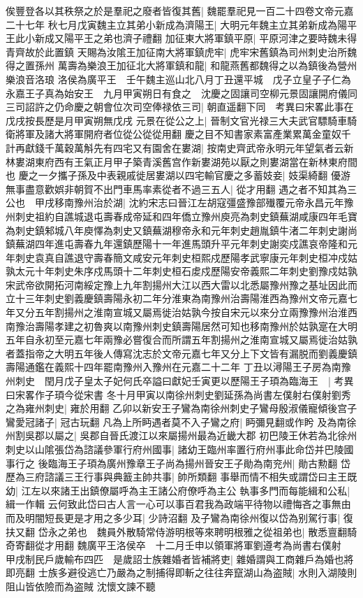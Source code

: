 俟豐登各以其秩祭之於是羣祀之廢者皆復其舊|{
	魏罷羣祀見一百二十四卷文帝元嘉二十七年}
秋七月戊寅魏主立其弟小新成為濟陽王|{
	大明元年魏主立其弟新成為陽平王此小新成又陽平王之弟也濟子禮翻}
加征東大將軍鎮平原|{
	平原河津之要時魏未得青齊故於此置鎮}
天賜為汝隂王加征南大將軍鎮虎牢|{
	虎牢宋舊鎮為司州刺史治所魏得之置孫州}
萬壽為樂浪王加征北大將軍鎮和龍|{
	和龍燕舊都魏得之以為鎮後為營州樂浪音洛琅}
洛侯為廣平王　壬午魏主巡山北八月丁丑還平城　戊子立皇子子仁為永嘉王子真為始安王　九月甲寅朔日有食之　沈慶之固讓司空柳元景固讓開府儀同三司詔許之仍命慶之朝會位次司空俸禄依三司|{
	朝直遥翻下同　考異曰宋畧此事在戊戌按長歷是月甲寅朔無戊戌}
元景在從公之上|{
	晉制文官光禄三大夫武官驃騎車騎衛將軍及諸大將軍開府者位從公從從用翻}
慶之目不知書家素富產業累萬金童奴千計再獻錢千萬穀萬斛先有四宅又有園舍在婁湖|{
	按南史齊武帝永明元年望氣者云新林婁湖東府西有王氣正月甲子築青溪舊宫作新婁湖苑以厭之則婁湖當在新林東府間也}
慶之一夕攜子孫及中表親戚徙居婁湖以四宅輸官慶之多蓄妓妾|{
	妓渠綺翻}
優游無事盡意歡娯非朝賀不出門車馬率素從者不過三五人|{
	從才用翻}
遇之者不知其為三公也　甲戌移南豫州治於湖|{
	沈約宋志曰晉江左胡寇彊盛豫部殱覆元帝永昌元年豫州刺史祖約自譙城退屯壽春成帝延和四年僑立豫州庾亮為刺史鎮蕪湖咸康四年毛寶為刺史鎮邾城八年庾懌為刺史又鎮蕪湖穆帝永和元年刺史趙胤鎮牛渚二年刺史謝尚鎮蕪湖四年進屯壽春九年還鎮歷陽十一年進馬頭升平元年刺史謝奕戍譙哀帝隆和元年刺史袁真自譙退守壽春簡文咸安元年刺史桓熙戍歷陽孝武寧康元年刺史桓冲戍姑孰太元十年刺史朱序戍馬頭十二年刺史桓石䖍戍歷陽安帝義熙二年刺史劉豫戍姑孰宋武帝欲開拓河南綏定豫上九年割揚州大江以西大雷以北悉屬豫州豫之基址因此而立十三年刺史劉義慶鎮壽陽永初二年分淮東為南豫州治壽陽淮西為豫州文帝元嘉七年又分五年割揚州之淮南宣城又屬焉徙治姑孰今按自宋元以來分立兩豫豫州治淮西南豫治壽陽孝建之初魯爽以南豫州刺史鎮壽陽居然可知也移南豫州於姑孰寔在大明五年自永初至元嘉七年兩豫必嘗復合而所謂五年割揚州之淮南宣城又屬焉徙治姑孰者蓋指帝之大明五年後人傳寫沈志於文帝元嘉七年又分上下文皆有漏脱而劉義慶鎮壽陽通鑑在義熙十四年罷南豫州入豫州在元嘉二十二年}
丁丑以潯陽王子房為南豫州刺史　閏月戊子皇太子妃何氏卒謚曰獻妃壬寅更以歷陽王子頊為臨海王　|{
	考異曰宋畧作子頊今從宋書}
冬十月甲寅以南徐州刺史劉延孫為尚書左僕射右僕射劉秀之為雍州刺史|{
	雍於用翻}
乙卯以新安王子鸞為南徐州刺史子鸞母殷淑儀寵傾後宫子鸞愛冠諸子|{
	冠古玩翻}
凡為上所眄遇者莫不入子鸞之府|{
	眄彌見翻或作盻}
及為南徐州割吳郡以屬之|{
	吳郡自晉氏渡江以來屬揚州最為近畿大郡}
初巴陵王休若為北徐州刺史以山隂張岱為諮議參軍行府州國事|{
	諸幼王臨州率置行府州事此命岱并巴陵國事行之}
後臨海王子頊為廣州豫章王子尚為揚州晉安王子勛為南兖州|{
	勛古勲翻}
岱歷為三府諮議三王行事與典籖主帥共事|{
	帥所類翻}
事舉而情不相失或謂岱曰主王既幼|{
	江左以來諸王出鎮僚屬呼為主王諸公府僚呼為主公}
執事多門而每能緝和公私|{
	緝一作輯}
云何致此岱曰古人言一心可以事百君我為政端平待物以禮悔吝之事無由而及明闇短長更是才用之多少耳|{
	少詩沼翻}
及子鸞為南徐州復以岱為别駕行事|{
	復扶又翻}
岱永之弟也　魏員外散騎常侍游明根等來聘明根雅之從祖弟也|{
	散悉亶翻騎奇寄翻從才用翻}
魏廣平王洛侯卒　十二月壬申以領軍將軍劉遵考為尚書右僕射　甲戌制民戶歲輸布四匹　是歲詔士族雜婚者皆補將吏|{
	雜婚謂與工商雜戶為婚也將即亮翻}
士族多避役逃亡乃嚴為之制捕得即斬之往往奔竄湖山為盗賊|{
	水則入湖陵則阻山皆依險而為盗賊}
沈懷文諫不聽

